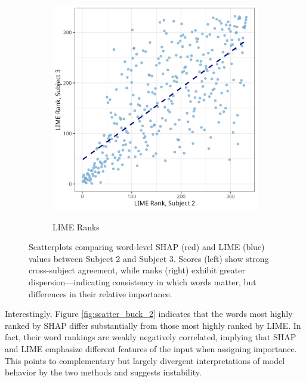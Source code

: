 \documentclass[10pt,letterpaper]{article}
\begin{document}
\begin{figure}[ht]
\begin{subfigure}[t]{0.22\textwidth}
        \label{subfig:scatter_buck_lime_raw}
    \end{subfigure}
    \hfill
    \begin{subfigure}[t]{0.22\textwidth}
        \centering
        \caption{LIME Ranks}
        \includegraphics[width=\textwidth]{figs/scatter_buck_lime_rank.png}
        \label{subfig:scatter_buck_lime_rank}
    \end{subfigure}
    \caption{Scatterplots comparing word-level SHAP (red) and LIME (blue) values between Subject 2 and Subject 3. Scores (left) show strong cross-subject agreement, while ranks (right) exhibit greater dispersion—indicating consistency in which words matter, but differences in their relative importance.}
    \label{fig:scatter_buck_1}
\end{figure}

Interestingly, Figure \ref{fig:scatter_buck_2} indicates that the words most highly ranked by SHAP differ substantially from those most highly ranked by LIME. In fact, their word rankings are weakly negatively correlated, implying that SHAP and LIME emphasize different features of the input when assigning importance. This points to complementary but largely divergent interpretations of model behavior by the two methods and suggests instability.
\end{document}
